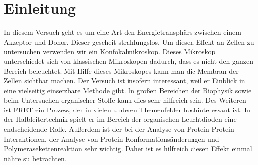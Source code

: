 

\chapter{Einleitung}
\label{chap:einleitung}

In diesem Versuch geht es um eine Art den Energietransphärs zwischen einem Akzeptor und Donor. Dieser gescheit strahlungslos. 
Um diesen Effekt an Zellen zu untersuchen verwenden wir ein Konfokalmikroskop. Dieses Mikroskop unterschiedet sich von klassischen 
Mikroskopen dadurch, dass es nicht den ganzen Bereich beleuchtet. Mit Hilfe dieses Mikroskopes kann man die Membran der Zellen sichtbar machen. 
Der Versuch ist insofern interessant, weil er Einblick in eine vielseitig einsetzbare Methode gibt. In großen Bereichen der Biophysik sowie beim Untersuchen 
organischer Stoffe kann dies sehr hilfreich sein. Des Weiteren ist FRET ein Prozess, der in vielen anderen Themenfelder hochinteressant ist. In der Halbleitertechnik 
spielt er im Bereich der organischen Leuchtdioden eine endscheidende Rolle. Außerdem ist der bei der Analyse von Protein-Protein-Interaktionen, der Analyse von Protein-Konformationsänderungen 
und Polymerasekettenreaktion sehr wichtig. Daher ist es hilfreich diesen Effekt einmal nähre su betrachten.
